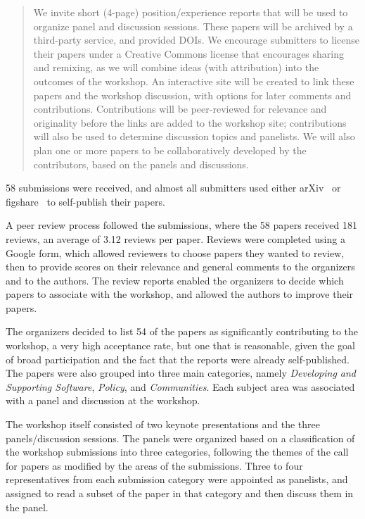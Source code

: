 \documentclass[11pt, oneside]{amsart}
\begin{document}
\begin{quote}
We invite short (4-page) position/experience reports that will be used
to organize panel and discussion sessions. These papers will be
archived by a third-party service, and provided DOIs. We encourage
submitters to license their papers under a Creative Commons license
that encourages sharing and remixing, as we will combine ideas (with
attribution) into the outcomes of the workshop.  An interactive site
will be created to link these papers and the workshop discussion, with
options for later comments and contributions. Contributions will be
peer-reviewed for relevance and originality before the links are added
to the workshop site; contributions will also be used to determine
discussion topics and panelists. We will also plan one or more papers
to be collaboratively developed by the contributors, based on the
panels and discussions.
\end{quote}

58 submissions were received, and almost all submitters used either
arXiv~\cite{arXiv-web} or figshare~\cite{figshare-web} to self-publish
their papers.

A peer review process followed the submissions, where the 58 papers
received 181 reviews, an average of 3.12 reviews per paper. Reviews
were completed using a Google form, which allowed reviewers to choose
papers they wanted to review, then to provide scores on their
relevance and general comments to the organizers and to the
authors. The review reports enabled the organizers to decide which
papers to associate with the workshop, and allowed the authors to
improve their papers.

The organizers decided to list 54 of the papers as significantly
contributing to the workshop, a very high acceptance rate, but one
that is reasonable, given the goal of broad participation and the fact
that the reports were already self-published. The papers were also
grouped into three main categories, namely \emph{Developing and
  Supporting Software}, \emph{Policy}, and \emph{Communities}. Each
subject area was associated with a panel and discussion at the
workshop.

The workshop itself consisted of two keynote presentations and the
three panels/discussion sessions. The panels were organized based on a
classification of the workshop submissions into three categories,
following the themes of the call for papers as modified by the areas
of the submissions. Three to four representatives from each submission
category were appointed as panelists, and assigned to read a subset of
the paper in that category and then discuss them in the panel.
\end{document}
